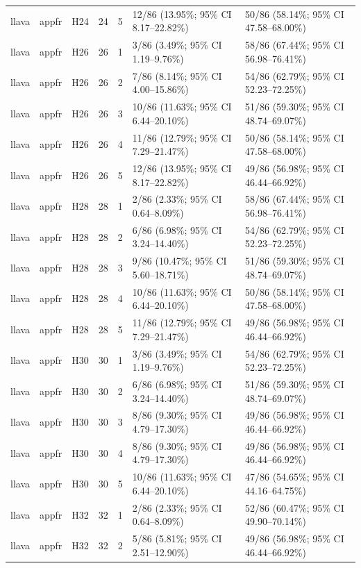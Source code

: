\begin{longtable}{lllrrll}
llava & appfr & H24 & 24 & 5 & 12/86 (13.95\%; 95\% CI 8.17–22.82\%) & 50/86 (58.14\%; 95\% CI 47.58–68.00\%) \\
llava & appfr & H26 & 26 & 1 & 3/86 (3.49\%; 95\% CI 1.19–9.76\%) & 58/86 (67.44\%; 95\% CI 56.98–76.41\%) \\
llava & appfr & H26 & 26 & 2 & 7/86 (8.14\%; 95\% CI 4.00–15.86\%) & 54/86 (62.79\%; 95\% CI 52.23–72.25\%) \\
llava & appfr & H26 & 26 & 3 & 10/86 (11.63\%; 95\% CI 6.44–20.10\%) & 51/86 (59.30\%; 95\% CI 48.74–69.07\%) \\
llava & appfr & H26 & 26 & 4 & 11/86 (12.79\%; 95\% CI 7.29–21.47\%) & 50/86 (58.14\%; 95\% CI 47.58–68.00\%) \\
llava & appfr & H26 & 26 & 5 & 12/86 (13.95\%; 95\% CI 8.17–22.82\%) & 49/86 (56.98\%; 95\% CI 46.44–66.92\%) \\
llava & appfr & H28 & 28 & 1 & 2/86 (2.33\%; 95\% CI 0.64–8.09\%) & 58/86 (67.44\%; 95\% CI 56.98–76.41\%) \\
llava & appfr & H28 & 28 & 2 & 6/86 (6.98\%; 95\% CI 3.24–14.40\%) & 54/86 (62.79\%; 95\% CI 52.23–72.25\%) \\
llava & appfr & H28 & 28 & 3 & 9/86 (10.47\%; 95\% CI 5.60–18.71\%) & 51/86 (59.30\%; 95\% CI 48.74–69.07\%) \\
llava & appfr & H28 & 28 & 4 & 10/86 (11.63\%; 95\% CI 6.44–20.10\%) & 50/86 (58.14\%; 95\% CI 47.58–68.00\%) \\
llava & appfr & H28 & 28 & 5 & 11/86 (12.79\%; 95\% CI 7.29–21.47\%) & 49/86 (56.98\%; 95\% CI 46.44–66.92\%) \\
llava & appfr & H30 & 30 & 1 & 3/86 (3.49\%; 95\% CI 1.19–9.76\%) & 54/86 (62.79\%; 95\% CI 52.23–72.25\%) \\
llava & appfr & H30 & 30 & 2 & 6/86 (6.98\%; 95\% CI 3.24–14.40\%) & 51/86 (59.30\%; 95\% CI 48.74–69.07\%) \\
llava & appfr & H30 & 30 & 3 & 8/86 (9.30\%; 95\% CI 4.79–17.30\%) & 49/86 (56.98\%; 95\% CI 46.44–66.92\%) \\
llava & appfr & H30 & 30 & 4 & 8/86 (9.30\%; 95\% CI 4.79–17.30\%) & 49/86 (56.98\%; 95\% CI 46.44–66.92\%) \\
llava & appfr & H30 & 30 & 5 & 10/86 (11.63\%; 95\% CI 6.44–20.10\%) & 47/86 (54.65\%; 95\% CI 44.16–64.75\%) \\
llava & appfr & H32 & 32 & 1 & 2/86 (2.33\%; 95\% CI 0.64–8.09\%) & 52/86 (60.47\%; 95\% CI 49.90–70.14\%) \\
llava & appfr & H32 & 32 & 2 & 5/86 (5.81\%; 95\% CI 2.51–12.90\%) & 49/86 (56.98\%; 95\% CI 46.44–66.92\%) \\

\end{longtable}
